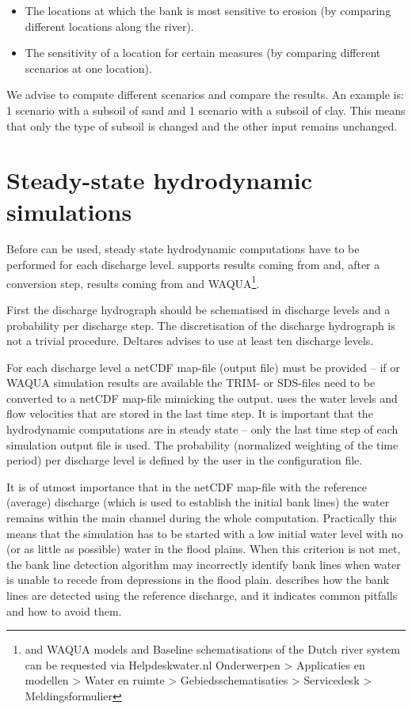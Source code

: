 \begin{itemize}
\item The locations at which the bank is most sensitive to erosion (by comparing different locations along the river).
\item The sensitivity of a location for certain measures (by comparing different scenarios at one location).
\end{itemize}

We advise to compute different scenarios and compare the results.
An example is: 1 scenario with a subsoil of sand and 1 scenario with a subsoil of clay.
This means that only the type of subsoil is changed and the other input remains unchanged.

\section{Steady-state hydrodynamic simulations}

Before \dfastbe can be used, steady state hydrodynamic computations have to be performed for each discharge level.
\dfastbe supports results coming from \dflowfm and, after a conversion step, results coming from \dflow and WAQUA\footnote{\dflowfm and WAQUA models and Baseline schematisations of the Dutch river system can be requested via Helpdeskwater.nl Onderwerpen > Applicaties en modellen > Water en ruimte > Gebiedsschematisaties > Servicedesk > Meldingsformulier}.

First the discharge hydrograph should be schematised in discharge levels and a probability per discharge step.
The discretisation of the discharge hydrograph is not a trivial procedure. Deltares advises to use at least ten discharge levels.

For each discharge level a netCDF map-file (\dflowfm output file) must be provided -- if \dflow or WAQUA simulation results are available the TRIM- or SDS-files need to be converted to a netCDF map-file mimicking the \dflowfm output.
\dfastbe uses the water levels and flow velocities that are stored in the last time step.
It is important that the hydrodynamic computations are in steady state -- only the last time step of each simulation output file is used.
The probability (normalized weighting of the time period) per discharge level is defined by the user in the configuration file.

\Note It is of utmost importance that in the netCDF map-file with the reference (average) discharge (which is used to establish the initial bank lines) the water remains within the main channel during the whole computation.
Practically this means that the simulation has to be started with a low initial water level with no (or as little as possible) water in the flood plains.
When this criterion is not met, the bank line detection algorithm may incorrectly identify bank lines when water is unable to recede from depressions in the flood plain.
 describes how the bank lines are detected using the reference discharge, and it indicates common pitfalls and how to avoid them.


